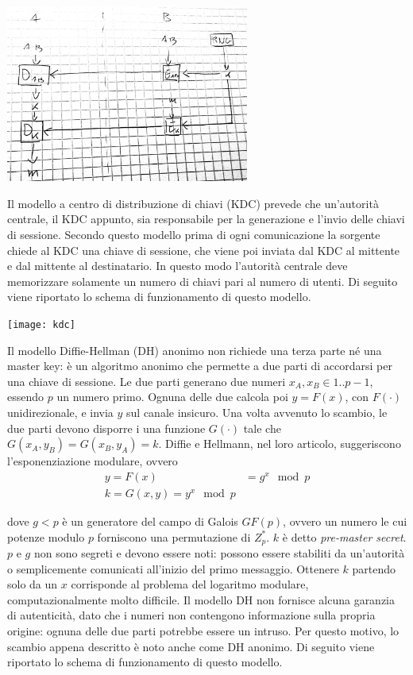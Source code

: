 \documentclass[answers, a4paper, 11pt]{exam}
\begin{document}
\begin{questions}
\begin{parts}
\begin{solution}
\includegraphics[width=0.6\textwidth]{masterkey}

Il modello a centro di distribuzione di chiavi (KDC) prevede che un'autorità centrale, il KDC appunto, sia responsabile per la generazione e l'invio delle chiavi di sessione.
Secondo questo modello prima di ogni comunicazione la sorgente chiede al KDC una chiave di sessione, che viene poi inviata dal KDC al mittente e dal mittente al destinatario.
In questo modo l'autorità centrale deve memorizzare solamente un numero di chiavi pari al numero di utenti.
Di seguito viene riportato lo schema di funzionamento di questo modello.

\texttt{[image: kdc]}

Il modello Diffie-Hellman (DH) anonimo non richiede una terza parte né una master key: è un algoritmo anonimo che permette a due parti di accordarsi per una chiave di sessione. 
Le due parti generano due numeri $x_A, x_B \in 1..p-1$, essendo $p$ un numero primo. 
Ognuna delle due calcola poi $y = F(x)$, con $F(\cdot)$ unidirezionale, e invia $y$ sul canale insicuro. 
Una volta avvenuto lo scambio, le due parti devono disporre i una funzione $G(\cdot)$ tale che $G(x_A, y_B) = G(x_B, y_A) = k$.
Diffie e Hellmann, nel loro articolo, suggeriscono l'esponenziazione modulare, ovvero
\begin{equation}
\begin{array}{ll}
y = F(x) &= g^x \mod p \\
k = G(x, y) = y^x \mod p
\end{array}
\end{equation}

dove $g < p$ è un generatore del campo di Galois $GF(p)$, ovvero un numero le cui potenze modulo $p$ forniscono una permutazione di $Z^*_p$.
$k$ è detto \textit{pre-master secret}.
$p$ e $g$ non sono segreti e devono essere noti: possono essere stabiliti da un'autorità o semplicemente comunicati all'inizio del primo messaggio.
Ottenere $k$ partendo solo da un $x$ corrisponde al problema del logaritmo modulare, computazionalmente molto difficile. 
Il modello DH non fornisce alcuna garanzia di autenticità, dato che i numeri non contengono informazione sulla propria origine: ognuna delle due parti potrebbe essere un intruso.
Per questo motivo, lo scambio appena descritto è noto anche come DH anonimo. 
Di seguito viene riportato lo schema di funzionamento di questo modello.


\end{solution}
\end{parts}
\end{questions}
\end{document}
